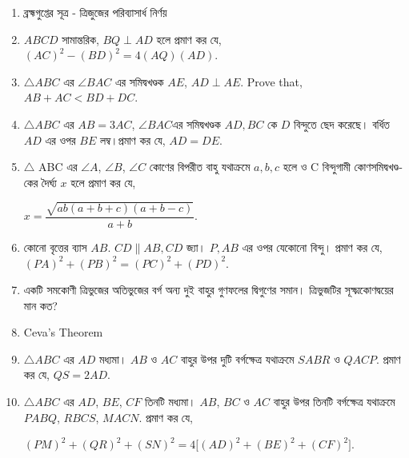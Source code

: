 \documentclass[11pt, a4paper]{article}
\begin{document}
\begin{enumerate}
	\item \textbengali{ব্রহ্মগুপ্তের সূত্র - ত্রিজুজের পরিব্যাসার্ধ নির্ণয়}
	
	\item $ ABCD $ \textbengali{সামান্তরিক}, $ BQ \perp AD $ \textbengali{হলে প্রমাণ কর যে,}  $ (AC)^2 - (BD)^2 = 4 (AQ) (AD) $.
	
	\item $ \bigtriangleup ABC $ \textbengali{এর} $ \angle BAC $ \textbengali{এর সমিদ্বখণ্ডক} $ AE $, $ AD \perp AE $. Prove that, $ AB + AC < BD + DC $.
	
	\item $ \bigtriangleup ABC $ \textbengali{এর} $ AB = 3AC $, $ \angle BAC $\textbengali{এর সমিদ্বখণ্ডক} $ AD, BC $ \textbengali{কে} $D$ \textbengali{বিন্দুতে ছেদ করেছে। বর্ধিত} $ AD $ \textbengali{এর ওপর } $BE$ \textbengali{লম্ব।প্রমাণ কর যে,} $ AD = DE $.
	
	\item $ \bigtriangleup $ ABC \textbengali{এর} $ \angle A $, $ \angle B $, $ \angle C $ \textbengali{কোণের বিপরীত বাহু যথাক্রমে} $ a,b,c $ \textbengali{হলে ও } C \textbengali{বিন্দুগামী কোণসমিদ্বখণ্ডকের দৈর্ঘ্য } $ x $ \textbengali{হলে প্রমাণ কর যে,}
\begin{center}
$ x = \dfrac{\sqrt{ab(a+b+c)(a+b-c)}}{a+b} $.
\end{center}

	\item \textbengali{কোনো বৃত্তের ব্যাস} $ AB $. $ CD \parallel AB, CD $ \textbengali{জ্যা।} $ P, AB $ \textbengali{এর ওপর যেকোনো বিন্দু। প্রমাণ কর যে,} $ (PA)^2 + (PB)^2 = (PC)^2 + (PD)^2 $.
	
	\item \textbengali{একটি সমকোণী ত্রিভুজের অতিভুজের বর্গ অন্য দুই বাহুর গুণফলের দ্বিগুণের সমান। }   \textbengali{ত্রিভুজটির  সূক্ষ্মকোণদ্বয়ের মান কত?}
	
	\item Ceva's Theorem
	
	\item $ \bigtriangleup ABC  $ \textbengali{এর} $AD$ \textbengali{মধ্যমা।} $ AB $ \textbengali{ও} $ AC $ \textbengali{বাহুর উপর দুটি বর্গক্ষেত্র যথাক্রমে} $ SABR $ \textbengali{ও} $ QACP $. \textbengali{প্রমাণ কর যে,} $ QS = 2AD $.
	
	\item $ \bigtriangleup ABC  $ \textbengali{এর} $AD$, $BE$, $CF$ \textbengali{তিনটি মধ্যমা।} $ AB $, $BC$ \textbengali{ও} $ AC $ \textbengali{বাহুর উপর তিনটি বর্গক্ষেত্র যথাক্রমে} $ PABQ $, $ RBCS $, $ MACN. $ \textbengali{প্রমাণ কর যে,} 
	\begin{center}
	$ (PM)^2 + (QR)^2 + (SN)^2 = 4\Big[ (AD)^2 + (BE)^2 + (CF)^2 \Big] $.
	 \end{center}
	 

\end{enumerate}
\end{document}
